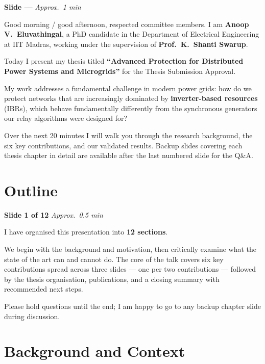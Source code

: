 \documentclass[12pt, a4paper]{article}
\newenvironment{notebox}{%
  \begin{tcolorbox}[
    colback=noteBg,
    colframe=iitmMaroon!40,
    boxrule=0.6pt,
    arc=3pt,
    left=8pt, right=8pt, top=6pt, bottom=6pt
  ]
  \setstretch{1.4}\small
}{%
  \end{tcolorbox}
}
\newcommand{\slidetag}[2]{%
  \noindent
  \textcolor{slideNum}{\footnotesize\bfseries Slide #1} \hfill
  \textcolor{iitmGold!80!black}{\footnotesize\itshape Approx.\ #2}\\[2pt]
}
\begin{document}
\slidetag{---}{1 min}
\begin{notebox}
Good morning / good afternoon, respected committee members.
I am \textbf{Anoop V.\ Eluvathingal}, a PhD candidate in the Department of Electrical
Engineering at IIT Madras, working under the supervision of
\textbf{Prof.\ K.\ Shanti Swarup}.

Today I present my thesis titled \textbf{``Advanced Protection for Distributed Power
Systems and Microgrids''} for the Thesis Submission Approval.

My work addresses a fundamental challenge in modern power grids: how do we protect
networks that are increasingly dominated by \textbf{inverter-based resources} (IBRs),
which behave fundamentally differently from the synchronous generators our relay
algorithms were designed for?

Over the next 20 minutes I will walk you through the research background, the six key
contributions, and our validated results. Backup slides covering each thesis chapter
in detail are available after the last numbered slide for the Q\&A.
\end{notebox}

\section{Outline}

\slidetag{1 of 12}{0.5 min}
\begin{notebox}
I have organised this presentation into \textbf{12 sections}.

We begin with the background and motivation, then critically examine what the state of
the art can and cannot do. The core of the talk covers six key contributions spread
across three slides --- one per two contributions --- followed by the thesis organisation,
publications, and a closing summary with recommended next steps.

Please hold questions until the end; I am happy to go to any backup chapter slide
during discussion.
\end{notebox}

\section{Background and Context}
\end{document}
